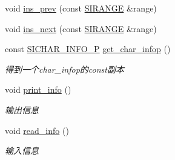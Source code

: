 \begin{DoxyCompactItemize}
\begin{DoxyCompactList}
\end{DoxyCompactList}\item 
void \hyperlink{class_s_i_c_h_a_r_n_o_d_e_a85ebada9a5d765d7f055bab903b6c6d2}{ins\+\_\+prev} (const \hyperlink{struct_s_i_r_a_n_g_e}{S\+I\+R\+A\+N\+GE} \&range)
\item 
void \hyperlink{class_s_i_c_h_a_r_n_o_d_e_af8048308dc6b0ffdf02caceb814ee8e3}{ins\+\_\+next} (const \hyperlink{struct_s_i_r_a_n_g_e}{S\+I\+R\+A\+N\+GE} \&range)
\item 
const \hyperlink{class_s_i_c_h_a_r___i_n_f_o}{S\+I\+C\+H\+A\+R\+\_\+\+I\+N\+F\+O\+\_\+P} \hyperlink{class_s_i_c_h_a_r_n_o_d_e_a95039205cd53a18d6f1b8ef1a80c90c2}{get\+\_\+char\+\_\+infop} ()
\begin{DoxyCompactList}\small\item\em 得到一个char\+\_\+infop的const副本 \end{DoxyCompactList}\item 
\mbox{\label{class_s_i_c_h_a_r_n_o_d_e_a4b4d71bb1d49d56399586b214897bec4}} 
void \hyperlink{class_s_i_c_h_a_r_n_o_d_e_a4b4d71bb1d49d56399586b214897bec4}{print\+\_\+info} ()
\begin{DoxyCompactList}\small\item\em 输出信息 \end{DoxyCompactList}\item 
\mbox{\label{class_s_i_c_h_a_r_n_o_d_e_ae51d8c92371116aedf5510bb3096104c}} 
void \hyperlink{class_s_i_c_h_a_r_n_o_d_e_ae51d8c92371116aedf5510bb3096104c}{read\+\_\+info} ()
\begin{DoxyCompactList}\small\item\em 输入信息 \end{DoxyCompactList}\end{DoxyCompactItemize}
